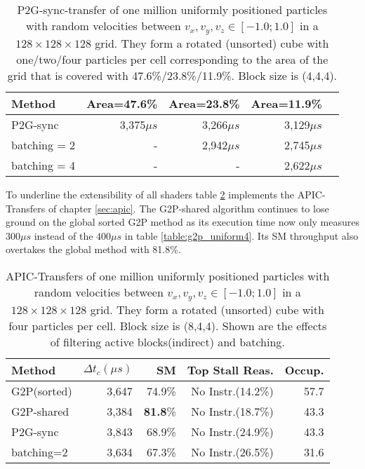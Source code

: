 \documentclass[m,times]{cgMA}
\begin{document}
\begin{table}[htpb]
  \begin{tabular}{ | l | r | r | r | r |}    \hline
    Method                 &  Area=47.6\% & Area=23.8\% &Area=11.9\%\\\hline
    P2G-sync		   &  3,375$\mu s$& 3,266$\mu s$ & 3,129$\mu s$\\\hline
    batching = 2           & -&2,942$\mu s$ & 2,745$\mu s$\\\hline
    batching = 4           & -&- &2,622$\mu s$\\\hline
 \end{tabular}
 \caption{P2G-sync-transfer of one million uniformly positioned particles with random velocities between $v_x,v_y,v_z \in [-1.0;1.0]$ in a $128\times 128\times128$ grid. They form a rotated (unsorted) cube with one/two/four particles per cell corresponding to the area of the grid that is covered with 47.6\%/23.8\%/11.9\%. Block size is (4,4,4).}
 \label{table:p2g_area}
\end{table}
To underline the extensibility of all shaders table \ref{table:apic} implements the APIC-Transfers of chapter \ref{sec:apic}. The G2P-shared algorithm continues to lose ground on the global sorted G2P method as its execution time now only measures $300\mu s$ instead of the $400\mu s$ in table \ref{table:g2p_uniform4}. Its SM throughput also overtakes the global method with 81.8\%.
\begin{table}[htpb]
  \begin{tabular}{ | l | r | r | r | r |}    \hline
    Method                 &  $\Delta t_c(\mu s)$ &SM    & Top Stall Reas.  & Occup.\\\hline
    G2P(sorted)		   &    3,647             &74.9\%&No Instr.(14.2\%)& 57.7\\\hline
    G2P-shared             &    3,384             &\textbf{81.8}\%&No Instr.(18.7\%) & 43.3\\\hline
    \hline
    P2G-sync               &    3,843             &68.9\%&No Instr.(24.9\%) & 43.3\\\hline
    batching=2             &    3,634             &67.3\%&No Instr.(26.5\%) & 31.6\\\hline
 \end{tabular}
 \caption{APIC-Transfers of one million uniformly positioned particles with random velocities between $v_x,v_y,v_z \in [-1.0;1.0]$ in a $128\times 128\times128$ grid. They form a rotated (unsorted) cube with four particles per cell. Block size is (8,4,4). Shown are the effects of filtering active blocks(indirect) and batching.}\label{table:apic}
\end{table}
\end{document}
